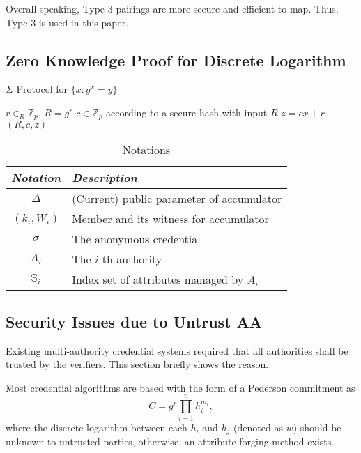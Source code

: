 \documentclass[journal]{IEEEtran}
\begin{document}
Overall speaking, Type 3 pairings are more secure and efficient to map. Thus, Type 3 is used in this paper.

\subsection{Zero Knowledge Proof for Discrete Logarithm}

\begin{algorithm}[h]
	\caption{$\Sigma$ Protocol for $\{x: g^x = y\}$}\label{alg:dlproof}
	\begin{algorithmic}[1]
		\STATE $r\in_R\mathbb{Z}_p$, $R = g^r$ 
		\STATE $c\in \mathbb{Z}_p $ according to a secure hash with input $R$
		\STATE $z = cx + r$
		\RETURN $(R, c, z)$
	\end{algorithmic}
\end{algorithm}

	\begin{table}[h]
		\caption{Notations}
		\label{table:notate}
		\centering
		\begin{tabular}{c|l}
			\hline
			\emph{Notation} & \emph{Description}\\
			\hline
			$\Delta$ & (Current) public parameter of accumulator\\
			$(k_i, W_i)$ & Member and its witness for accumulator\\
			$\sigma$ & The anonymous credential\\
			$A_i$ & The $i$-th authority\\
			$\mathbb{S}_i$ & Index set of attributes managed by $A_i$\\
		\end{tabular}
	\end{table}
\subsection{Security Issues due to Untrust AA}
Existing multi-authority credential systems required that all authorities shall be trusted by the verifiers. This section briefly shows the reason.

Most credential algorithms are based with the form of a Pederson commitment as 
$$C = g^r\prod_{i=1}^n h_i^{m_i},$$
where the discrete logarithm between each $h_i$ and $h_j$ (denoted as $w$) should be unknown to untrusted parties, otherwise, an attribute forging method exists. 
\end{document}
